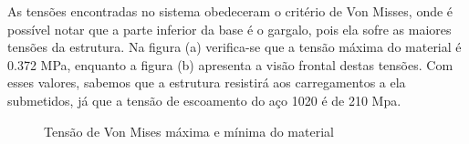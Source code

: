  As tensões encontradas no sistema obedeceram o critério de Von Misses, onde é possível notar que a parte inferior da base é o gargalo, pois ela sofre as maiores tensões da estrutura. Na figura (a) verifica-se que a tensão máxima do material é 0.372 MPa, enquanto a figura (b) apresenta a visão frontal destas tensões. Com esses valores, sabemos que a estrutura resistirá aos carregamentos a ela submetidos, já que a tensão de escoamento do aço 1020 é de 210 Mpa.

 \begin{figure}[!ht]
	 \caption{Tensão de Von Mises máxima e mínima do material}
	 \label{fig:analise_von_mises}
 \end{figure}


